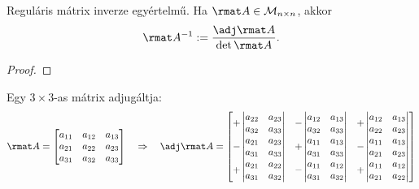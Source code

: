 \begin{statement}
  Reguláris mátrix inverze egyértelmű. Ha $\rmat A \in \mathcal M_{n \times n}$,
  akkor
  $$
    \rmat A^{-1} := \frac{\adj \rmat A}{\det \rmat A}
    \text.
  $$

  \begin{proof}
    \vspace{6em}
  \end{proof}
\end{statement}

\begin{blueBox}
  Egy $3 \times 3$-as mátrix adjugáltja:
  $$
    \rmat A = \begin{bmatrix}
      a_{11} & a_{12} & a_{13} \\
      a_{21} & a_{22} & a_{23} \\
      a_{31} & a_{32} & a_{33}
    \end{bmatrix}
    \quad
    \Rightarrow
    \quad
    \adj \rmat A = \begin{bmatrix}
      + \begin{vmatrix}
          a_{22} & a_{23} \\
          a_{32} & a_{33}
        \end{vmatrix}
       &
      - \begin{vmatrix}
          a_{12} & a_{13} \\
          a_{32} & a_{33}
        \end{vmatrix}
       &
      +\begin{vmatrix}
         a_{12} & a_{13} \\
         a_{22} & a_{23}
       \end{vmatrix}
      \\
      - \begin{vmatrix}
          a_{21} & a_{23} \\
          a_{31} & a_{33}
        \end{vmatrix}
       &
      + \begin{vmatrix}
          a_{11} & a_{13} \\
          a_{31} & a_{33}
        \end{vmatrix}
       &
      - \begin{vmatrix}
          a_{11} & a_{13} \\
          a_{21} & a_{23}
        \end{vmatrix}
      \\
      + \begin{vmatrix}
          a_{21} & a_{22} \\
          a_{31} & a_{32}
        \end{vmatrix}
       &
      - \begin{vmatrix}
          a_{11} & a_{12} \\
          a_{31} & a_{32}
        \end{vmatrix}
       &
      +\begin{vmatrix}
         a_{11} & a_{12} \\
         a_{21} & a_{22}
       \end{vmatrix}
    \end{bmatrix}
  $$
\end{blueBox}